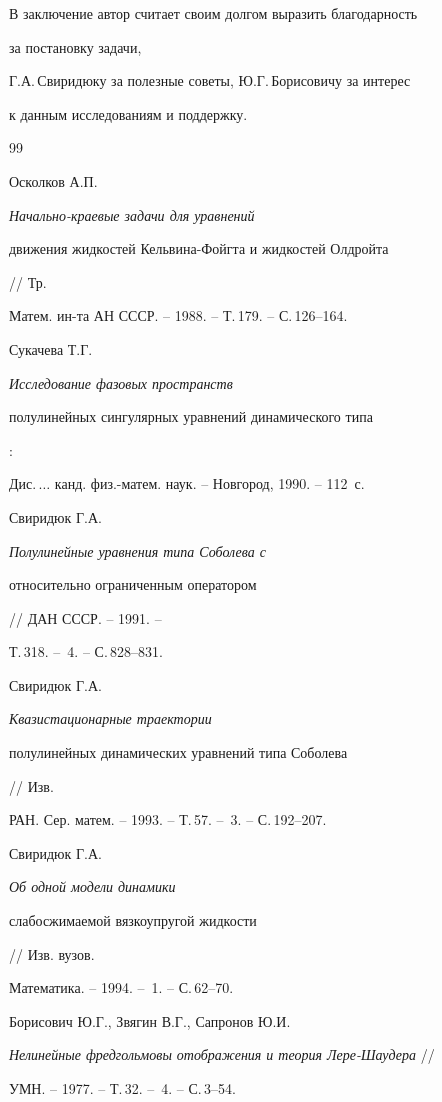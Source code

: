 В заключение автор считает своим долгом выразить благодарность


 за постановку задачи,


Г.А.\,Свиридюку за полезные советы, Ю.Г.\,Борисовичу за интерес


к данным исследованиям и поддержку.





\begin{thebibliography}{99}




Осколков А.П. {\em Начально-краевые задачи для уравнений


движения жидкостей Кельвина-Фойгта и жидкостей Олдройта} // Тр.


Матем. ин-та АН СССР. -- 1988. -- Т.\,179. -- С.\,126--164.




Сукачева Т.Г. {\em Исследование фазовых пространств


полулинейных сингулярных уравнений динамического типа}:


Дис.\,$\dotsc$ канд. физ.-матем. наук. -- Новгород, 1990. -- 112~с.




Свиридюк Г.А. {\em Полулинейные уравнения типа Соболева с


относительно ограниченным оператором} // ДАН СССР. -- 1991. --


Т.\,318. -- \No\,4. -- С.\,828--831.




Свиридюк Г.А. {\em Квазистационарные траектории


полулинейных динамических уравнений типа Соболева} // Изв.


РАН. Сер. матем. -- 1993. -- Т.\,57. -- \No\,3. -- С.\,192--207.




Свиридюк Г.А. {\em Об одной модели динамики


слабосжимаемой вязкоупругой жидкости} // Изв. вузов.


Математика. -- 1994. -- \No\,1. -- С.\,62--70.




Борисович Ю.Г., Звягин В.Г., Сапронов Ю.И.


{\em Нелинейные фредгольмовы отображения и теория Лере-Шаудера} //


УМН. -- 1977. -- Т.\,32. -- \No\,4. -- С.\,3--54.



\end{thebibliography}
